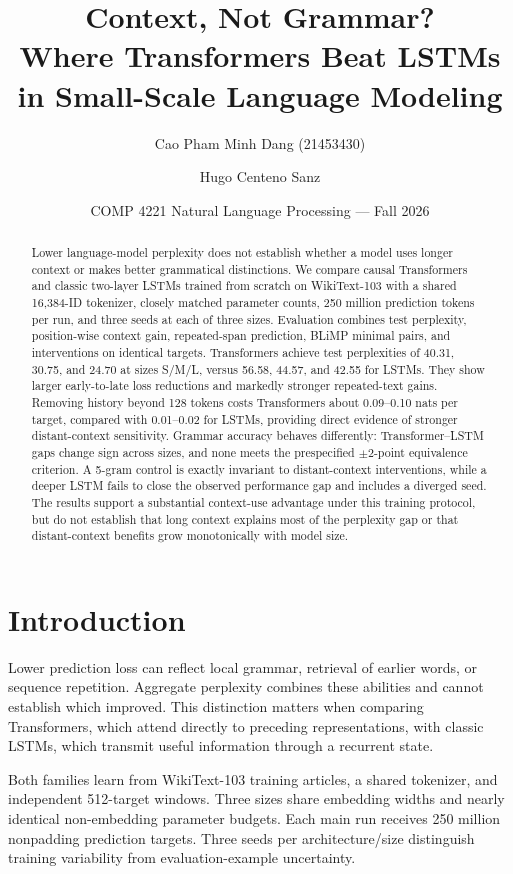 \documentclass[10pt]{article}
\title{\vspace{-1.5em}\textbf{Context, Not Grammar?}\\
Where Transformers Beat LSTMs in Small-Scale Language Modeling}
\author{Cao Pham Minh Dang (21453430) \and Hugo Centeno Sanz}
\date{COMP 4221 Natural Language Processing --- Fall 2026}
\begin{document}
\maketitle

\begin{abstract}
Lower language-model perplexity does not establish whether a model uses longer context or makes better grammatical distinctions. We compare causal Transformers and classic two-layer LSTMs trained from scratch on WikiText-103 with a shared 16,384-ID tokenizer, closely matched parameter counts, 250 million prediction tokens per run, and three seeds at each of three sizes. Evaluation combines test perplexity, position-wise context gain, repeated-span prediction, BLiMP minimal pairs, and interventions on identical targets. Transformers achieve test perplexities of 40.31, 30.75, and 24.70 at sizes S/M/L, versus 56.58, 44.57, and 42.55 for LSTMs. They show larger early-to-late loss reductions and markedly stronger repeated-text gains. Removing history beyond 128 tokens costs Transformers about 0.09--0.10 nats per target, compared with 0.01--0.02 for LSTMs, providing direct evidence of stronger distant-context sensitivity. Grammar accuracy behaves differently: Transformer--LSTM gaps change sign across sizes, and none meets the prespecified $\pm2$-point equivalence criterion. A 5-gram control is exactly invariant to distant-context interventions, while a deeper LSTM fails to close the observed performance gap and includes a diverged seed. The results support a substantial context-use advantage under this training protocol, but do not establish that long context explains most of the perplexity gap or that distant-context benefits grow monotonically with model size.
\end{abstract}

\section{Introduction}

Lower prediction loss can reflect local grammar, retrieval of earlier words, or sequence repetition. Aggregate perplexity combines these abilities and cannot establish which improved. This distinction matters when comparing Transformers, which attend directly to preceding representations, with classic LSTMs, which transmit useful information through a recurrent state.

Both families learn from WikiText-103 training articles, a shared tokenizer, and independent 512-target windows. Three sizes share embedding widths and nearly identical non-embedding parameter budgets. Each main run receives 250 million nonpadding prediction targets. Three seeds per architecture/size distinguish training variability from evaluation-example uncertainty.
\end{document}
